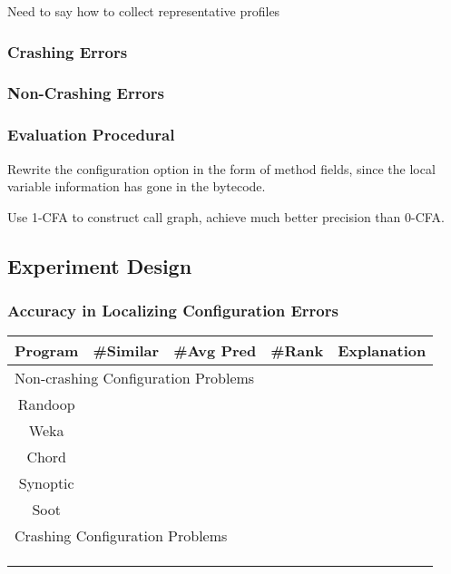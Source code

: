 Need to say how to collect representative profiles

\subsubsection{Crashing Errors}

\subsubsection{Non-Crashing Errors}


\subsubsection{Evaluation Procedural}

Rewrite the configuration option in the form of method fields, since
the local variable information has gone in the bytecode.

Use 1-CFA to construct call graph, achieve much better precision
than 0-CFA. 

\subsection{Experiment Design}



\subsubsection{Accuracy in Localizing Configuration Errors}

\begin{table}[t]
\setlength{\tabcolsep}{.84\tabcolsep}
\begin{tabular}{|c|c|c|c|c|}
\hline
 Program & \#Similar & \#Avg Pred & \#Rank & Explanation \\
 \hline
\hline
\multicolumn{5}{|l|}{Non-crashing Configuration Problems}   \\
 \hline
 Randoop & &  &&  \\
\hline
 Weka &  & & & \\
\hline
 Chord & & & &\\
\hline
 Synoptic & & && \\
\hline
 Soot &  &    &&\\
\hline
\hline
\multicolumn{5}{|l|}{Crashing Configuration Problems}   \\
\hline
& & & &\\
\hline
& & & &\\
\hline
& & & &\\
\hline
\end{tabular}

\end{table}

